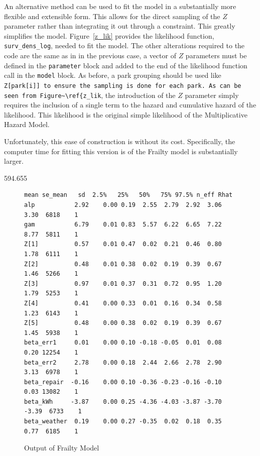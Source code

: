 An alternative method can be used to fit the model in a substantially more flexible and extensible form. This allows for the direct sampling of the $Z$ parameter rather than integrating it out through a constraint. This greatly simplifies the model. Figure~\ref{z_lik} provides the likelihood function, \lstinline{surv_dens_log}, needed to fit the model. The other alterations required to the code are the same as in in the previous case, a vector of $Z$ parameters must be defined in the \lstinline{parameter} block and added to the end of the likelihood function call in the \lstinline{model} block. As before, a park grouping should be used like \lstinline{Z[park[i]] to ensure the sampling is done for each park. As can be seen from Figure~\ref{z_lik}, the introduction of the $Z$ parameter simply requires the inclusion of a single term to the hazard and cumulative hazard of the likelihood. This likelihood is the original simple likelihood of the Multiplicative Hazard Model. 

Unfortunately, this ease of construction is without its cost. Specifically, the computer time for fitting this version is of the Frailty model is substantially larger. 

594.655


\begin{figure}[htbp]
    \centering
    \begin{lstlisting}[belowskip=-2 \baselineskip]
              mean se_mean   sd  2.5%   25%   50%   75% 97.5% n_eff Rhat
alp           2.92    0.00 0.19  2.55  2.79  2.92  3.06  3.30  6818    1
gam           6.79    0.01 0.83  5.57  6.22  6.65  7.22  8.77  5811    1
Z[1]          0.57    0.01 0.47  0.02  0.21  0.46  0.80  1.78  6111    1
Z[2]          0.48    0.01 0.38  0.02  0.19  0.39  0.67  1.46  5266    1
Z[3]          0.97    0.01 0.37  0.31  0.72  0.95  1.20  1.79  5253    1
Z[4]          0.41    0.00 0.33  0.01  0.16  0.34  0.58  1.23  6143    1
Z[5]          0.48    0.00 0.38  0.02  0.19  0.39  0.67  1.45  5938    1
beta_err1     0.01    0.00 0.10 -0.18 -0.05  0.01  0.08  0.20 12254    1
beta_err2     2.78    0.00 0.18  2.44  2.66  2.78  2.90  3.13  6978    1
beta_repair  -0.16    0.00 0.10 -0.36 -0.23 -0.16 -0.10  0.03 13082    1
beta_kWh     -3.87    0.00 0.25 -4.36 -4.03 -3.87 -3.70 -3.39  6733    1
beta_weather  0.19    0.00 0.27 -0.35  0.02  0.18  0.35  0.77  6185    1
\end{lstlisting}
    \caption{Output of Frailty Model}
    \label{out_frail}
\end{figure}

